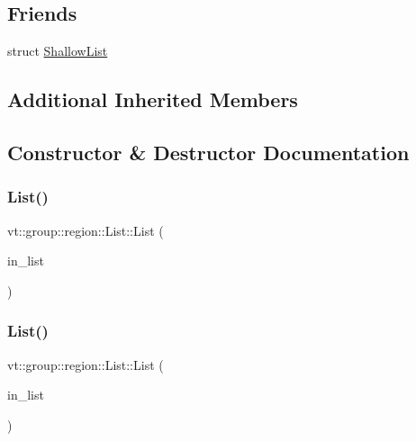 \subsection*{Friends}
\begin{DoxyCompactItemize}
\item 
struct \hyperlink{structvt_1_1group_1_1region_1_1_list_a69d0f04a06a9f069becd00a6c894dbe9}{Shallow\+List}
\end{DoxyCompactItemize}
\subsection*{Additional Inherited Members}


\subsection{Constructor \& Destructor Documentation}
\mbox{\label{structvt_1_1group_1_1region_1_1_list_a1c670c1ead337cb8abceecf810e629ca}} 
\subsubsection{\texorpdfstring{List()}{List()}\hspace{0.1cm}{\footnotesize\ttfamily [1/6]}}
{\footnotesize\ttfamily vt\+::group\+::region\+::\+List\+::\+List (\begin{DoxyParamCaption}\item[{\hyperlink{structvt_1_1group_1_1region_1_1_region_a4e35b2fc6dca06aca0b7bc0e19b35c5a}{List\+Type} const \&}]{in\+\_\+list }\end{DoxyParamCaption})\hspace{0.3cm}{\ttfamily [explicit]}}

\mbox{\label{structvt_1_1group_1_1region_1_1_list_ad065a462795289684b4bce819702c99d}} 
\subsubsection{\texorpdfstring{List()}{List()}\hspace{0.1cm}{\footnotesize\ttfamily [2/6]}}
{\footnotesize\ttfamily vt\+::group\+::region\+::\+List\+::\+List (\begin{DoxyParamCaption}\item[{\hyperlink{structvt_1_1group_1_1region_1_1_region_a4e35b2fc6dca06aca0b7bc0e19b35c5a}{List\+Type} \&\&}]{in\+\_\+list }\end{DoxyParamCaption})\hspace{0.3cm}{\ttfamily [explicit]}}

